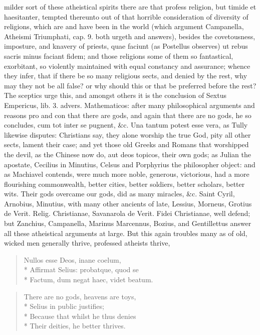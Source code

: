 {milder sort of these atheistical spirits there are that profess
religion, but timide et haesitanter, tempted thereunto out of that
horrible consideration of diversity of religions, which are and have
been in the world (which argument Campanella, Atheismi Triumphati, cap.
9. both urgeth and answers), besides the covetousness, imposture, and
knavery of priests, quae faciunt (as Postellus observes) ut rebus
sacris minus faciant fidem; and those religions some of them so
fantastical, exorbitant, so violently maintained with equal constancy
and assurance; whence they infer, that if there be so many religious
sects, and denied by the rest, why may they not be all false? or why
should this or that be preferred before the rest? The sceptics urge
this, and amongst others it is the conclusion of Sextus Empericus, lib.
3. advers. Mathematicos: after many philosophical arguments and reasons
pro and con that there are gods, and again that there are no gods, he
so concludes, cum tot inter se pugnent, \&c. Una tantum potest esse
vera, as Tully likewise disputes: Christians say, they alone worship
the true God, pity all other sects, lament their case; and yet those
old Greeks and Romans that worshipped the devil, as the Chinese now do,
aut deos topicos, their own gods; as Julian the apostate,
Cecilius in Minutius, Celsus and Porphyrius the philosopher
object: and as Machiavel contends, were much more noble, generous,
victorious, had a more flourishing commonwealth, better cities, better
soldiers, better scholars, better wits. Their gods overcame our gods,
did as many miracles, \&c. Saint Cyril, Arnobius, Minutius, with many
other ancients of late, Lessius, Morneus, Grotius de Verit. Relig.
Christianae, Savanarola de Verit. Fidei Christianae, well defend; but
Zanchius, Campanella, Marinus Marcennus, Bozius, and Gentillettus
answer all these atheistical arguments at large. But this again
troubles many as of old, wicked men generally thrive, professed
atheists thrive,

\begin{latin}
\begin{verse}
Nullos esse Deos, inane coelum,\\*
Affirmat Selius: probatque, quod se\\*
Factum, dum negat haec, videt beatum.
\end{verse}
\end{latin}

\begin{verse}
There are no gods, heavens are toys,\\*
Selius in public justifies;\\*
Because that whilst he thus denies\\*
Their deities, he better thrives.
\end{verse}

}

